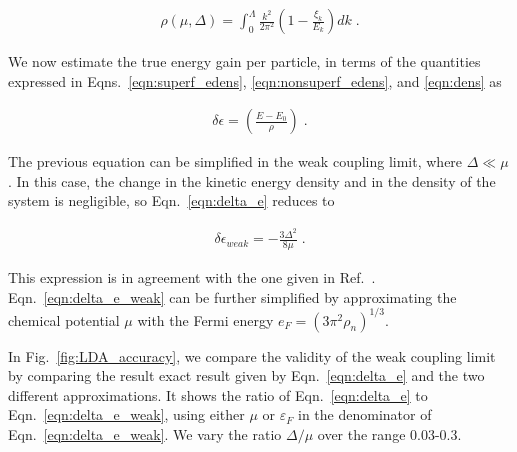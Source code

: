 \documentclass[
    amsmath,amssymb,
    aps,
    prc,
    floatfix,
]{revtex4-2}
\begin{document}
\begin{appendix}
    \begin{eqnarray}\label{eqn:dens}
        \rho(\mu,\Delta) = \int_0^\Lambda\frac{k^2}{2\pi^2}\left(1-\frac{\xi_k}{E_k}\right)dk\;.
    \end{eqnarray}

\noindent We now estimate the true energy gain per particle, in terms of the quantities expressed in Eqns.~\ref{eqn:superf_edens}, \ref{eqn:nonsuperf_edens}, and \ref{eqn:dens} as

    \begin{eqnarray}\label{eqn:delta_e}
        \delta\epsilon = \left(\frac{E-E_0}{\rho}\right)\;.
    \end{eqnarray}

\noindent The previous equation can be simplified in the weak coupling limit, where $\Delta\ll\mu$. In this case, the change in the kinetic energy density and in the density of the system is negligible, so Eqn.~\ref{eqn:delta_e} reduces to 

    \begin{eqnarray}\label{eqn:delta_e_weak}
        \delta\epsilon_{weak} = -\frac{3\Delta^2}{8\mu}\;.
    \end{eqnarray}

\noindent This expression is in agreement with the one given in Ref.~\cite{PhysRevLett793347}.
Eqn.~\ref{eqn:delta_e_weak} can be further simplified by approximating the chemical potential $\mu$ with the Fermi energy $e_F=(3\pi^2\rho_n)^{1/3}$.

In Fig.~\ref{fig:LDA_accuracy}, we compare the validity of the weak coupling limit by comparing the result exact result given by Eqn.~\ref{eqn:delta_e} and the two different approximations. It shows the ratio of Eqn.~\ref{eqn:delta_e} to Eqn.~\ref{eqn:delta_e_weak}, using either $\mu$ or $\varepsilon_F$ in the denominator of Eqn.~\ref{eqn:delta_e_weak}. We vary the ratio $\Delta/\mu$ over the range 0.03-0.3.


\end{appendix}
\end{document}
